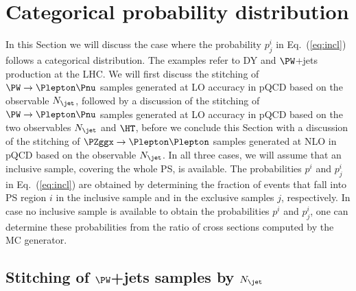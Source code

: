 \section{Categorical probability distribution}
\label{sec:examples_background_yield}

In this Section we will discuss the case where the probability $p_{j}^{i}$ in Eq.~(\ref{eq:incl}) follows a categorical distribution.
The examples refer to DY and $\PW$+jets production at the LHC.
We will first discuss the stitching of $\PW \to \Plepton\Pnu$ samples generated at LO accuracy in pQCD based on the observable $N_{\jet}$, 
followed by a discussion of the stitching of $\PW \to \Plepton\Pnu$ samples generated at LO accuracy in pQCD based on the two observables $N_{\jet}$ and $\HT$,
before we conclude this Section with a discussion of the stitching of $\PZggx \to \Plepton\Plepton$ samples generated at NLO in pQCD based on the observable $N_{\jet}$.
In all three cases, we will assume that an inclusive sample, covering the whole PS, is available.
The probabilities $p^{i}$ and $p_{j}^{i}$ in Eq.~(\ref{eq:incl})
are obtained by determining the fraction of events that fall into PS region $i$ in the inclusive sample and in the exclusive samples $j$, respectively.
In case no inclusive sample is available to obtain the probabilities $p^{i}$ and $p_{j}^{i}$,
one can determine these probabilities from the ratio of cross sections computed by the MC generator.

\subsection{Stitching of $\PW$+jets samples by $N_{\jet}$}
\label{sec:WJets_vs_Njet}

